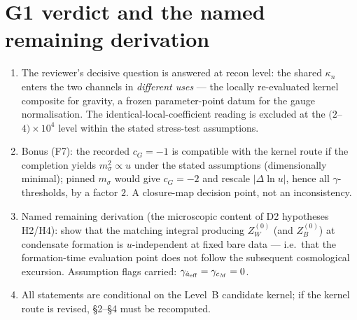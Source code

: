 \documentclass[11pt,a4paper]{article}
\begin{document}
\section{G1 verdict and the named remaining derivation}
\begin{enumerate}[leftmargin=1.9em,itemsep=2pt,label=\textbf{V\arabic*.}]
\item The reviewer's decisive question is answered at recon level: the shared
$\kappa_n$ enters the two channels in \emph{different uses} --- the locally
re-evaluated kernel composite for gravity, a frozen parameter-point datum for
the gauge normalisation. The identical-local-coefficient reading is excluded
at the $(2$--$4)\times10^{4}$ level within the stated stress-test assumptions.
\item Bonus (F7): the recorded $c_G=-1$ is compatible with the kernel route if
the completion yields $m_\sigma^2\propto u$ under the stated assumptions
(dimensionally minimal); pinned $m_\sigma$ would give
$c_G=-2$ and rescale $|\Delta\ln u|$, hence all $\gamma$-thresholds, by a
factor $2$. A closure-map decision point, not an inconsistency.
\item Named remaining derivation (the microscopic content of D2 hypotheses
H2/H4): show that the matching integral producing $Z_W^{(0)}$ (and $Z_B^{(0)}$)
at condensate formation is $u$-independent at fixed bare data --- i.e.\ that
the formation-time evaluation point does not follow the subsequent cosmological
excursion. Assumption flags carried: $\gamma_{\hat a_{\rm eff}}=\gamma_{c_M}=0$.
\item All statements are conditional on the Level~B candidate kernel; if the
kernel route is revised, \S2--\S4 must be recomputed.
\end{enumerate}
\end{document}

